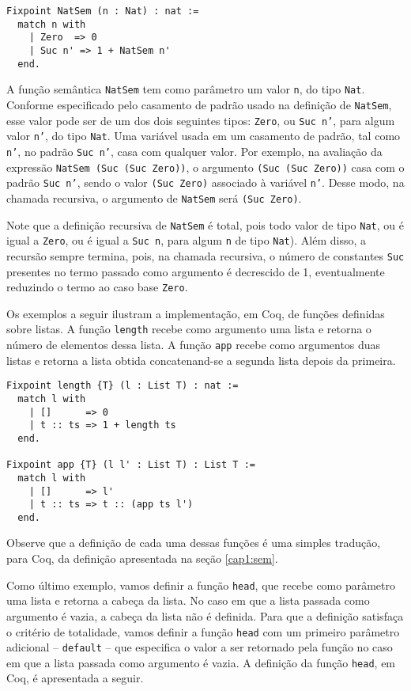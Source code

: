 \begin{lstlisting}
Fixpoint NatSem (n : Nat) : nat :=
  match n with
    | Zero  => 0
    | Suc n' => 1 + NatSem n'
  end.
\end{lstlisting}
A função semântica \texttt{NatSem} tem como parâmetro um valor \texttt{n}, do tipo \texttt{Nat}. Conforme especificado pelo casamento de padrão usado na definição de \texttt{NatSem}, esse valor pode ser de um dos dois seguintes tipos: \texttt{Zero}, ou \texttt{Suc n'}, para algum valor \texttt{n'}, do tipo \texttt{Nat}. Uma variável usada em um casamento de padrão, tal como \texttt{n'}, no padrão \texttt{Suc n'}, casa com qualquer valor. Por exemplo, na avaliação da expressão \texttt{NatSem (Suc (Suc Zero))}, o argumento \texttt{(Suc (Suc Zero))} casa com o padrão \texttt{Suc n'}, sendo o valor \texttt{(Suc Zero)} associado à variável \texttt{n'}. Desse modo, na chamada recursiva, o argumento de \texttt{NatSem} será \texttt{(Suc Zero)}. 

Note que a definição recursiva de \texttt{NatSem} \'e total, pois todo valor de tipo \texttt{Nat}, ou \'e igual a \texttt{Zero}, ou é igual a \texttt{Suc n}, para algum \texttt{n} de tipo \texttt{Nat}). Além disso, a recursão sempre termina, pois, na chamada recursiva, o  n\'umero de constantes \texttt{Suc} presentes no termo passado como argumento é decrescido de 1, eventualmente reduzindo o termo ao caso base \texttt{Zero}.

Os exemplos a seguir ilustram a implementação, em Coq, de funções definidas sobre listas. A função \texttt{length} recebe como argumento uma lista e retorna o número de elementos dessa lista. A função \texttt{app} recebe como argumentos duas listas e retorna a lista obtida concatenand-se a segunda lista depois da primeira. 

\begin{lstlisting}
Fixpoint length {T} (l : List T) : nat :=
  match l with
    | []      => 0
    | t :: ts => 1 + length ts
  end.

Fixpoint app {T} (l l' : List T) : List T :=
  match l with
    | []      => l'
    | t :: ts => t :: (app ts l')
  end.
\end{lstlisting}
Observe que a defini\c{c}\~ao de cada uma dessas fun\c{c}\~oes é uma simples 
tradu\c{c}\~ao, para Coq, da definição apresentada na se\c{c}\~ao \ref{cap1:sem}.

Como último exemplo, vamos definir a função \texttt{head}, que recebe como parâmetro uma lista e retorna a cabeça da lista. No caso em que a lista passada como argumento é vazia, a cabeça da lista não é definida. Para que a definição satisfaça o critério de totalidade, vamos definir a função \texttt{head} com um primeiro parâmetro adicional -- \texttt{default} -- que especifica o valor a ser retornado pela função no caso em que a lista passada como argumento é vazia. A definição da função \texttt{head}, em Coq, é apresentada a seguir.


